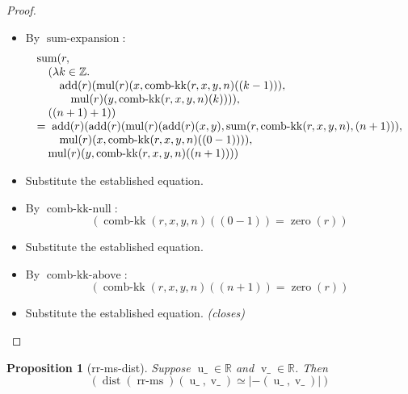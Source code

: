 \documentclass[11pt]{article}
\theoremstyle{plain}
\newtheorem{proposition}{Proposition}
\begin{document}
\begin{proof}
\begin{itemize}[leftmargin=2.8em, itemsep=4pt, parsep=1pt]
  \item[\textbf{36}] By $\operatorname{sum\text{-}expansion}$:
\begin{equation*}
\begin{array}{@{}l@{}} \operatorname{sum}(r, \\ \quad (\lambda k \in \mathbb{Z}.\; \\ \quad \quad \operatorname{add}(r)(\operatorname{mul}(r)(x, \operatorname{comb\text{-}kk}(r, x, y, n)((k - 1))), \\ \quad \quad \quad \operatorname{mul}(r)(y, \operatorname{comb\text{-}kk}(r, x, y, n)(k)))), \\ \quad ((n + 1) + 1)) \\ =\; \operatorname{add}(r)(\operatorname{add}(r)(\operatorname{mul}(r)(\operatorname{add}(r)(x, y), \operatorname{sum}(r, \operatorname{comb\text{-}kk}(r, x, y, n), (n + 1))), \\ \quad \quad \operatorname{mul}(r)(x, \operatorname{comb\text{-}kk}(r, x, y, n)((0 - 1)))), \\ \quad \operatorname{mul}(r)(y, \operatorname{comb\text{-}kk}(r, x, y, n)((n + 1)))) \end{array}
\end{equation*}

  \item[\textbf{37}] Substitute the established equation.
  \item[\textbf{38}] By $\operatorname{comb\text{-}kk\text{-}null}$:
\begin{equation*}
(\operatorname{comb\text{-}kk}(r, x, y, n)((0 - 1)) = \operatorname{zero}(r))
\end{equation*}

  \item[\textbf{39}] Substitute the established equation.
  \item[\textbf{40}] By $\operatorname{comb\text{-}kk\text{-}above}$:
\begin{equation*}
(\operatorname{comb\text{-}kk}(r, x, y, n)((n + 1)) = \operatorname{zero}(r))
\end{equation*}

  \item[\textbf{41--42}] Substitute the established equation.  \emph{(closes)}
\end{itemize}
\end{proof}

\bigskip

\begin{proposition}[rr-ms-dist]
Suppose $\operatorname{u\_} \in \mathbb{R}$ and $\operatorname{v\_} \in \mathbb{R}$. Then
\begin{equation*}
(\operatorname{dist}(\operatorname{rr\text{-}ms})(\operatorname{u\_}, \operatorname{v\_}) \simeq \lvert -(\operatorname{u\_}, \operatorname{v\_}) \rvert)
\end{equation*}

\end{proposition}
\end{document}
